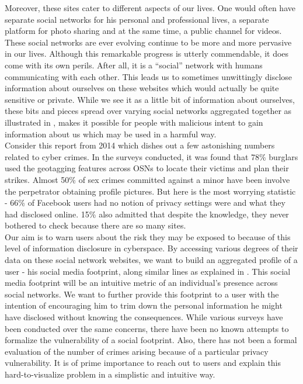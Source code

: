 \documentclass[conference]{IEEEtran}
\begin{document}
Moreover, these sites cater to different aspects of our lives. One would often have separate social networks for his personal and professional lives, a separate platform for photo sharing and at the same time, a public channel for videos. These social networks are ever evolving continue to be more and more pervasive in our lives. Although this remarkable progress is utterly commendable, it does come with its own perils. After all, it is a ``social'' network with humans communicating with each other. This leads us to sometimes unwittingly disclose information about ourselves on these websites which would actually be quite sensitive or private. While we see it as a little bit of information about ourselves, these bits and pieces spread over varying social networks aggregated together as illustrated in \cite{privacypaper}, makes it possible for people with malicious intent to gain information about us which may be used in a harmful way.\\

Consider this report\cite{newsarticle} from 2014 which dishes out a few astonishing numbers related to cyber crimes. In the surveys conducted, it was found that 78\% burglars used the geotagging features across OSNs to locate their victims and plan their strikes. Almost 50\% of sex crimes committed against a minor have been involve the perpetrator obtaining profile pictures. But here is the most worrying statistic - 66\% of Facebook users had no notion of privacy settings were and what they had disclosed online. 15\% also admitted that despite the knowledge, they never bothered to check because there are so many sites.\\

Our aim is to warn users about the risk they may be exposed to because of this level of information disclosure in cyberspace. By accessing various degrees of their data on these social network websites, we want to build an aggregated profile of a user - his social media footprint, along similar lines as explained in \cite{emergingthreat}. This social media footprint will be an intuitive metric of an individual’s presence across social networks. We want to further provide this footprint to a user with the intention of encouraging him to trim down the personal information he might have disclosed without knowing the consequences. While various surveys have been conducted over the same concerns, there have been no known attempts to formalize the vulnerability of a social footprint. Also, there has not been a formal evaluation of the number of crimes arising because of a particular privacy vulnerability. It is of prime importance to reach out to users and explain this hard-to-visualize problem in a simplistic and intuitive way.
\end{document}
